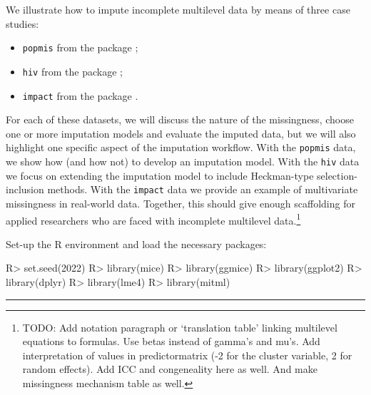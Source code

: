 \documentclass[
]{jss}
\providecommand{\tightlist}{%
  \setlength{\itemsep}{0pt}\setlength{\parskip}{0pt}}
\begin{document}
We illustrate how to impute incomplete multilevel data by means of three
case studies:

\begin{itemize}
\tightlist
\item
  \texttt{popmis} from the  package \citep[simulated data on
  perceived popularity, \(n = 2,000\) pupils across \(N = 100\)
  schools,][]{mice};
\item
  \texttt{hiv} from the  package \citep[simulated data on HIV
  diagnoses, \(n = 6,416\) patients across \(N = 9\) regions,][]{GJRM};
\item
  \texttt{impact} from the  package \citep[empirical data
  on traumatic brain injuries, \(n = 11,022\) patients across \(N = 15\)
  studies,][]{metamisc}.
\end{itemize}

For each of these datasets, we will discuss the nature of the
missingness, choose one or more imputation models and evaluate the
imputed data, but we will also highlight one specific aspect of the
imputation workflow. With the \texttt{popmis} data, we show how (and how
not) to develop an imputation model. With the \texttt{hiv} data we focus
on extending the imputation model to include Heckman-type
selection-inclusion methods. With the \texttt{impact} data we provide an
example of multivariate missingness in real-world data. Together, this
should give enough scaffolding for applied researchers who are faced
with incomplete multilevel data.\footnote{TODO: Add notation paragraph
  or `translation table' linking multilevel equations to 
  formulas. Use betas instead of gamma's and mu's. Add interpretation of
  values in predictormatrix (-2 for the cluster variable, 2 for random
  effects). Add ICC and congeneality here as well. And make missingness
  mechanism table as well.}

Set-up the R environment and load the necessary packages:

\begin{CodeChunk}
\begin{CodeInput}
R> set.seed(2022)
R> library(mice)
R> library(ggmice)
R> library(ggplot2)
R> library(dplyr)
R> library(lme4)
R> library(mitml)
\end{CodeInput}
\end{CodeChunk}

\begin{center}\rule{0.5\linewidth}{0.5pt}\end{center}
\end{document}
